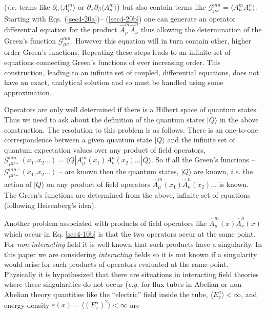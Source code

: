 \documentclass[a4paper,aps,showpacs]{revtex4}
\begin{document}
({\it i.e.} terms like $\partial_\alpha \langle A^m_\mu \rangle$ or
$\partial_\alpha \partial_\beta \langle A^m_\mu \rangle$)
but also contain terms like $\mathcal{G}^{mn}_{\mu\nu} =
\langle A^m_\mu A^n_\nu \rangle$. Starting with Eqs. (\ref{sec4-20a})--
(\ref{sec4-20b}) one can generate an operator differential
equation for the product $\hat A^m_\mu \hat A^n_\nu$ thus allowing
the determination of the Green's function $\mathcal{G}^{mn}_{\mu\nu}$.
However this equation will in turn contain other, higher order
Green's functions. Repeating these steps leads to an infinite set
of equations connecting Green's functions of ever increasing
order. This construction, leading to an infinite set of coupled,
differential equations, does not have an exact, analytical solution
and so must be handled using some approximation.
\par
Operators are only well determined if there is a Hilbert space of quantum
states. Thus we need to ask about the definition of the quantum states
$| Q \rangle$ in the above construction. The resolution to this
problem is as follows: There is an one-to-one correspondence
between a given quantum state $| Q \rangle$ and the infinite set
of quantum expectation values over any product of field operators,
$\mathcal{G}^{mn \cdots}_{\mu\nu \cdots}(x_1, x_2 \ldots) =
\langle Q | A^m_\mu (x_1) A^n_\nu (x_2) \ldots
| Q \rangle$. So if all the Green's functions
-- $\mathcal{G}^{mn \cdots}_{\mu\nu \cdots}(x_1, x_2 \ldots)$ --
are known then the quantum states, $| Q \rangle$ are known,
\textit{i.e.} the action of $| Q \rangle$ on any product
of field operators $\hat A^m_\mu (x_1) \hat A^n_\nu (x_2) \ldots$
is known. The Green's functions are determined from the above,
infinite set of equations (following Heisenberg's idea).
\par
Another problem associated with products of field operators
like $\hat A^m_\mu (x) \hat A^n_\nu (x)$ which occur in
Eq. \eqref{sec4-10b} is that the two operators occur at the
same point. For \textit{non-interacting} field it is well
known that such products have a singularity. In this paper
we are considering \textit{interacting} fields so it is
not known if a singularity would arise for such products
of operators evaluated at the same point. Physically
it is hypothesized that there are situations in interacting
field theories where these singularities do not occur
({\it e.g.} for flux tubes in Abelian or non-Abelian theory
quantities like the ``electric'' field inside the tube,
$\langle E^a_z \rangle < \infty$, and energy density
$\varepsilon (x) = \langle (E^a_z)^2 \rangle < \infty$ are
\end{document}
